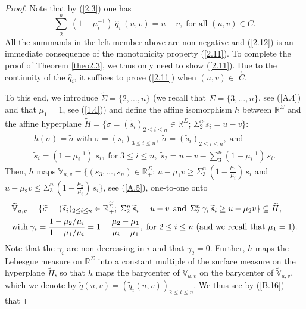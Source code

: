 \documentclass[10pt,a4paper]{amsart}
\def\IR{{\mathbb R}}
\def\IV{{\mathbb V}}
\def\dis{\displaystyle}
\def\f{\footnotesize}
\def\wh{\widehat}
\def\wt{\widetilde}
\begin{document}
\begin{proof}
Note that by (\ref{2.3}) one has
\begin{equation}\label{2.13}
\dis\sum^n_2 \;(1 - \mu^{-1}_i) \; \wh{q}_i \,(u,v) = u-v, \; \mbox{for all $(u,v) \in C$}.
\end{equation}
All the summands in the left member above are non-negative and (\ref{2.12}) is an immediate consequence of the monotonicity property (\ref{2.11}). To complete the proof of Theorem \ref{theo2.3}, we thus only need to show (\ref{2.11}). Due to the continuity of the $\wh{q}_i$, it suffices to prove (\ref{2.11}) when $(u,v) \in \; \stackrel{_\circ}{C}$.

\medskip
To this end, we introduce $\wt{\Sigma} = \{2,\dots,n\}$ (we recall that $\Sigma = \{3,\dots, n\}$, see (\ref{A.4}) and that $\mu_1 = 1$, see (\ref{1.4})) and define the affine isomorphism $h$ between $\IR^\Sigma$ and the affine hyperplane $\wt{H} = \{\wt{\sigma} = (\wt{s}_i)_{2 \le i \le n} \in \IR^{\wt{\Sigma}}$; $\Sigma_2^n \, \wt{s}_i = u-v\}$:
\begin{equation}\label{2.14}
\begin{array}{l}
h(\sigma) = \wt{\sigma} \; \mbox{with} \; \sigma = (s_i)_{3 \le i \le n}, \; \wt{\sigma} = (\wt{s}_i)_{2 \le  i \le n}, \; \mbox{and}
\\[1ex]
\wt{s}_i = (1 - \mu^{-1}_i) \; s_i, \; \mbox{for} \; 3 \le i \le n, \; \wt{s}_2 = u-v - \sum^n_3 (1- \mu_i^{-1}) \, s_i .
\end{array}
\end{equation}
Then, $h$ maps $\IV_{u,v} = \{(s_3,\dots, s_n) \in \IR^\Sigma_+$; $u - \mu_1 v \ge \Sigma^n_3 \,(1 - \frac{\mu_1}{\mu_i})\, s_i$ and $u - \mu_2 v \le \Sigma^n_3 \,(1 - \frac{\mu_2}{\mu_i}) \,s_i\}$, see (\ref{A.5}), one-to-one onto
\begin{equation}\label{2.15}
\begin{array}{l}
\wt{\IV}_{u,v} = \{ \wt{\sigma} = (\wt{s}_i)_{2 \le i \le n} \in \IR^{\wt{\Sigma}}_+; \; \Sigma_2^n \, \wt{s}_i = u-v \;\,\mbox{and} \; \,\Sigma_2^n \, \gamma_i \,\wt{s}_i \ge u - \mu_2 v\} \subseteq \wt{H},
\\[1ex]
\mbox{with} \; \gamma_i = \mbox{\f $\dis\frac{1 - \mu_2/\mu_i}{1 - \mu_1/\mu_i}$} = 1 -  \mbox{\f $\dis\frac{\mu_2-\mu_1}{ \mu_i - \mu_1}$} , \; \mbox{for $2 \le i \le n$ (and we recall that $\mu_1 = 1)$}.
\end{array}
\end{equation}
Note that the $\gamma_i$ are non-decreasing in $i$ and that $\gamma_2 = 0$. Further, $h$ maps the Lebesgue measure on $\IR^\Sigma$ into a constant multiple of the surface measure on the hyperplane $\wt{H}$, so that $h$ maps the barycenter of $\IV_{u,v}$ on the barycenter of $\wt{\IV}_{u,v}$, which we denote by $\wt{q}(u,v) = (\wt{q}_i (u,v))_{2 \le i \le n}$. We thus see by (\ref{B.16}) that

\end{proof}
\end{document}
